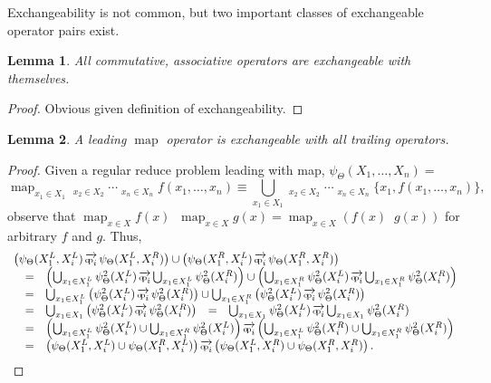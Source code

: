 \documentclass{article}
\newtheorem{lemma}{Lemma}
\newcommand{\OpSym}{\mathrm{O\!p}}
\newcommand{\opsym}{{\scriptstyle \mathrm{o\!p}}}
\newcommand{\OpCurry}[3][]{\mathop{\OpSym^{#1}_{#2}{#3}}}
\newcommand{\opcurry}[3][]{\mathop{\opsym^{#1}_{#2}{#3}}}
\newcommand{\Op}[2][]{\OpCurry[#1]{#2}{}}
\newcommand{\op}[2][]{\opcurry[#1]{#2}{}}
\newcommand{\VecOp}[2][]{\mathop{\overrightarrow{\OpSym^{#1}_{#2}}}}
\newcommand{\vecop}[2][]{\mathop{\overrightarrow{\opsym^{#1}_{#2}}}}
\newcommand{\GNP}{\psi_{\Theta}}
\DeclareMathOperator*{\map}{map}
\begin{document}
Exchangeability is not common, but two important classes of
exchangeable operator pairs exist.
\begin{lemma}
  All commutative, associative operators are exchangeable with
  themselves.
\end{lemma}
\begin{proof}
  Obvious given definition of exchangeability.
\end{proof}
\begin{lemma}\label{lem:map}
  A leading $\map$ operator is exchangeable with all trailing
  operators.
\end{lemma}
\begin{proof}
  Given a regular reduce problem leading with map, $\GNP(X_1,\ldots,X_n) =$
  \[
  \map_{x_1 \in X_1}\Op{2}_{x_2 \in X_2}\cdots\Op{n}_{x_n \in X_n} f(x_1,\ldots,x_n) \equiv \bigcup_{x_1 \in X_1}\VecOp{2}_{x_2 \in X_2}\cdots\VecOp{n}_{x_n \in X_n} \{x_1,f(x_1,\ldots,x_n)\},
  \]
  observe that $\map_{x \in X} f(x) \vecop{i} \map_{x \in X} g(x) =
  \map_{x \in X} (f(x) \op{i} g(x))$ for arbitrary $f$ and $g$.  Thus,
  \[ \begin{array}{rclcl}
    \lefteqn{\left( \GNP(X^L_1,X^L_i) \vecop{i} \GNP(X^L_1,X^R_i) \right) \cup \left(\GNP(X^R_1,X^L_i) \vecop{i} \GNP(X^R_1,X^R_i) \right)} \\
    & = & \multicolumn{3}{l}{\left( \bigcup_{x_1 \in X^L_1} \GNP^2(X^L_i) \vecop{i} \bigcup_{x_1 \in X^L_1} \GNP^2(X^R_i) \right) \cup \left( \bigcup_{x_1 \in X^R_1} \GNP^2(X^L_i) \vecop{i} \bigcup_{x_1 \in X^R_1} \GNP^2(X^R_i) \right)} \\
    & = & \multicolumn{3}{l}{\bigcup_{x_1 \in X^L_1} \left( \GNP^2(X^L_i) \vecop{i} \GNP^2(X^R_i) \right) \cup \bigcup_{x_1 \in X^R_1} \left( \GNP^2(X^L_i) \vecop{i} \GNP^2(X^R_i) \right)} \\
    & = & \bigcup_{x_1 \in X_1} \left( \GNP^2(X^L_i) \vecop{i} \GNP^2(X^R_i) \right) & = & \bigcup_{x_1 \in X_1} \GNP^2(X^L_i) \vecop{i} \bigcup_{x_1 \in X_1} \GNP^2(X^R_i) \\
    & = & \multicolumn{3}{l}{\left( \bigcup_{x_1 \in X^L_1} \GNP^2(X^L_i) \cup \bigcup_{x_1 \in X^R_1} \GNP^2(X^L_i) \right) \vecop{i} \left( \bigcup_{x_1 \in X^L_1} \GNP^2(X^R_i) \cup \bigcup_{x_1 \in X^R_1} \GNP^2(X^R_i) \right)} \\
    & = & \multicolumn{3}{l}{\left( \GNP(X^L_1,X^L_i) \cup \GNP(X^R_1,X^L_i) \right) \vecop{i} \left( \GNP(X^L_1,X^R_i) \cup \GNP(X^R_1,X^R_i) \right) .}
  \end{array} \]
\end{proof}
\end{document}
